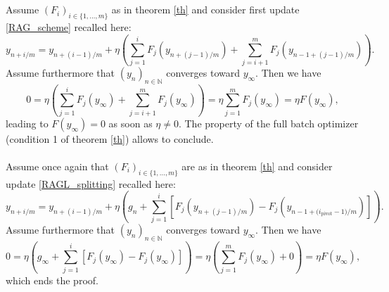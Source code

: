 \documentclass[article,authoryear,jmlmc]{beg_32}             %
\begin{document}
\section{}
\label{proof}

Assume $(F_i)_{i\in\{1,...,m\}}$ as in theorem \ref{th} and consider first update \eqref{RAG_scheme} recalled here: 
\begin{equation}
  y_{n+i/m} = y_{n+(i-1)/m}+\eta \left(\sum_{j=1}^i F_j\left(y_{n+(j-1)/m}\right)+\sum_{j=i+1}^m F_j\left(y_{n-1+(j-1)/m}\right)\right).
\end{equation}
Assume furthermore that $(y_n)_{n\in\mathbb{N}}$ converges toward $y_\infty$. 
Then we have 
\begin{equation}
  0= \eta \left(\sum_{j=1}^i F_j\left(y_{\infty}\right)+\sum_{j=i+1}^m F_j\left(y_{\infty}\right)\right) = \eta \sum_{j=1}^m F_j(y_\infty) = \eta F(y_\infty),
\end{equation}
leading to $F(y_\infty) = 0$ as soon as $\eta\neq 0$. 
The property of the full batch optimizer (condition 1 of theorem \ref{th}) allows to conclude. \\ \ \\

Assume once again that $(F_i)_{i\in\{1,...,m\}}$ are as in theorem \ref{th} and consider update \eqref{RAGL_splitting} recalled here: 
\begin{equation}
  y_{n+i/m} = y_{n+(i-1)/m}+\eta \left(g_n+\displaystyle{\sum_{j=1}^i} \left[F_j\left(y_{n+(j-1)/m}\right)-F_j\left(y_{{n-1+(i_{\text{pivot}}-1})/m}\right)\right]\right).
\end{equation}
Assume furthermore that $(y_n)_{n\in\mathbb{N}}$ converges toward $y_\infty$. 
Then we have 
\begin{equation}
  0= \eta \left(g_\infty+\displaystyle{\sum_{j=1}^i} \left[F_j\left(y_{\infty}\right)-F_j\left(y_{\infty}\right)\right] \right) = \eta \left(\sum_{j=1}^m F_j(y_\infty) +0\right)= \eta F(y_\infty),
\end{equation}
which ends the proof. 
\end{document}
